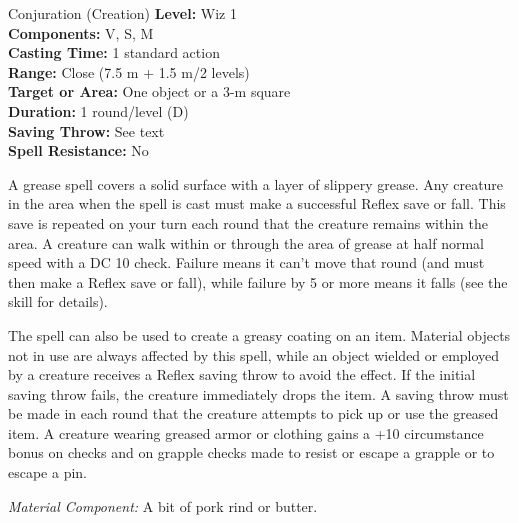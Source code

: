 {Conjuration (Creation)}
{
	\textbf{Level:}
	Wiz 1\\
	\textbf{Components:}
	V, S, M\\
	\textbf{Casting Time:}
	1 standard action\\
	\textbf{Range:}
	Close (7.5 m + 1.5 m/2 levels)\\
	\textbf{Target or Area:}
	One object or a 3-m square\\
	\textbf{Duration:}
	1 round/level (D)\\
	\textbf{Saving Throw:}
	See text\\
	\textbf{Spell Resistance:}
	No\\
}
{
	A grease spell covers a solid surface with a layer of slippery grease. Any creature in the area when the spell is cast must make a successful Reflex save or fall. This save is repeated on your turn each round that the creature remains within the area. A creature can walk within or through the area of grease at half normal speed with a DC 10  check. Failure means it can't move that round (and must then make a Reflex save or fall), while failure by 5 or more means it falls (see the  skill for details).

	The spell can also be used to create a greasy coating on an item. Material objects not in use are always affected by this spell, while an object wielded or employed by a creature receives a Reflex saving throw to avoid the effect. If the initial saving throw fails, the creature immediately drops the item. A saving throw must be made in each round that the creature attempts to pick up or use the greased item. A creature wearing greased armor or clothing gains a +10 circumstance bonus on  checks and on grapple checks made to resist or escape a grapple or to escape a pin.

	\textit{Material Component:}
	A bit of pork rind or butter.

}
